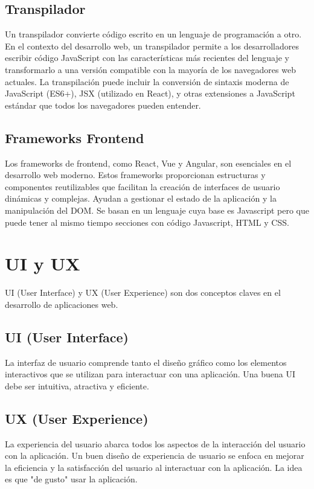\subsection{Transpilador}
Un transpilador convierte código escrito en un lenguaje de programación a otro. En el contexto del desarrollo web, un transpilador permite a los desarrolladores escribir código JavaScript con las características más recientes del lenguaje y transformarlo a una versión compatible con la mayoría de los navegadores web actuales. 
La transpilación puede incluir la conversión de sintaxis moderna de JavaScript (ES6+), JSX (utilizado en React), y otras extensiones a JavaScript estándar que todos los navegadores pueden entender.

\subsection{Frameworks Frontend}
Los frameworks de frontend, como React, Vue y Angular, son esenciales en el desarrollo web moderno. Estos frameworks proporcionan estructuras y componentes reutilizables que facilitan la creación de interfaces de usuario dinámicas y complejas. Ayudan a gestionar el estado de la aplicación y la manipulación del DOM. Se basan en un lenguaje cuya base es Javascript pero que puede tener al mismo tiempo secciones con código Javascript, HTML y CSS.

\section{UI y UX}
UI (User Interface) y UX (User Experience) son dos conceptos claves en el desarrollo de aplicaciones web.

\subsection{UI (User Interface)}
La interfaz de usuario comprende tanto el diseño gráfico como los elementos interactivos que se utilizan para interactuar con una aplicación. Una buena UI debe ser intuitiva, atractiva y eficiente.

\subsection{UX (User Experience)}
La experiencia del usuario abarca todos los aspectos de la interacción del usuario con la aplicación. Un buen diseño de experiencia de usuario se enfoca en mejorar la eficiencia y la satisfacción del usuario al interactuar con la aplicación. La idea es que "de gusto" usar la aplicación.


